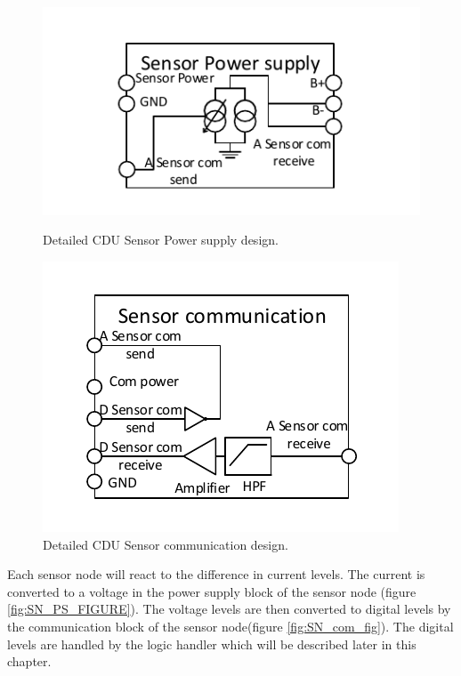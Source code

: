 \begin{figure}[H]
	\begin{minipage}[b]{0.45\linewidth}
	\centering
	\includegraphics[scale=1]{billeder/11ProjectDescription/CDUSPS}
	\caption{Detailed CDU Sensor Power supply design.}
	\label{fig:CDUSPS}
	\end{minipage}
	\hspace{0.5cm}
	\begin{minipage}[b]{0.45\linewidth}
	\centering
	\includegraphics[scale=1]{billeder/11ProjectDescription/CDUSC}
	\caption{Detailed CDU Sensor communication design.}
	\label{fig:CDUSC}
	\end{minipage}
\end{figure}
Each sensor node will react to the difference in current levels. The current is converted to a voltage in the power supply block of the sensor node (figure \ref{fig:SN_PS_FIGURE}). The voltage levels are then converted to digital levels by the communication block of the sensor node(figure \ref{fig:SN_com_fig}). The digital levels are handled by the logic handler which will be described later in this chapter.\\
